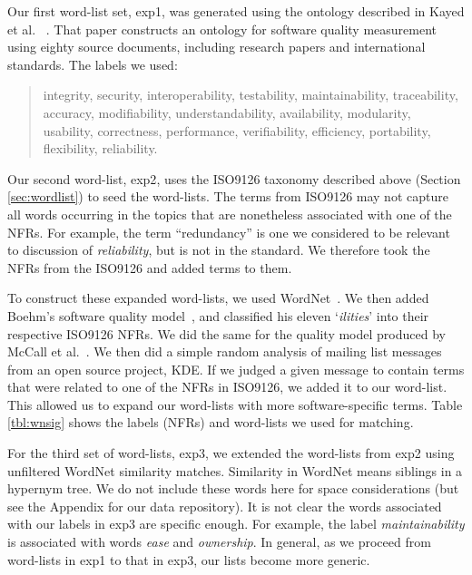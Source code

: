 \documentclass[smallextended]{svjour3}       %
\begin{document}
Our first word-list set, \textsf{exp1}, was generated using the ontology described in Kayed et al.~\cite{5072519} .
That paper constructs an ontology for software quality measurement using eighty source documents, including research papers and international standards. 
The labels we used:

\begin{quotation}
\small \noindent \textsf{
integrity, security,
interoperability, testability, maintainability, traceability,
accuracy, modifiability, understandability, availability, modularity,
usability, correctness, performance, verifiability, efficiency,
portability, flexibility, reliability.
}
\end{quotation}

Our second word-list, \textsf{exp2}, uses the ISO9126 taxonomy described above (Section \ref{sec:wordlist}) to seed the word-lists.
The terms from ISO9126 may not capture all words occurring in the topics that are nonetheless associated with one of the NFRs. 
For example, the term ``redundancy'' is one 
we considered to be
relevant to discussion of \emph{reliability}, but is not in the standard. 
We therefore took the NFRs from the ISO9126 and added terms to them.

To construct these expanded word-lists, we used
WordNet~\cite{Fellbaum1998}.
We then added Boehm's software quality model~\cite{Boehm+:1976:ICSE}, and classified his eleven `\emph{ilities}' into their respective ISO9126 NFRs. 
We did the same for the quality model produced by McCall et al.~\cite{mccall1977}. 
We then did a simple random analysis of mailing list messages from an open source project, KDE. If we judged a given message to contain terms that were
related to one of the NFRs in ISO9126, we added it to our word-list. This allowed us to expand our word-lists with more software-specific terms.
Table \ref{tbl:wnsig} shows the labels (NFRs) and word-lists we used for matching.

For the third set of word-lists, \textsf{exp3}, we extended the word-lists from \textsf{exp2} using unfiltered WordNet similarity matches. 
Similarity in WordNet means siblings in a hypernym tree. 
We do not include these words here for space considerations (but see the Appendix for our data repository). 
It is not clear the words associated with our labels in \textsf{exp3} are specific enough. For example, the label \emph{maintainability} is associated with
words \emph{ease} and \emph{ownership}. In general, as we proceed from word-lists in \textsf{exp1} to that in \textsf{exp3}, our lists become more generic.
\end{document}
